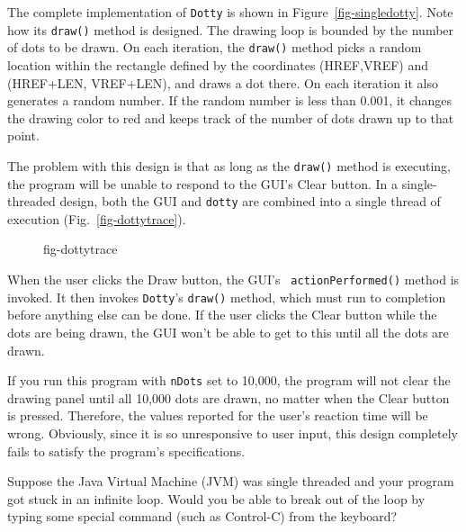 The complete implementation of {\tt Dotty} is shown in
Figure~\ref{fig-singledotty}. Note how its {\tt draw()} method is
designed.  The drawing loop is bounded by the number of dots to be
drawn.  On each iteration, the {\tt draw()} method picks a
random location within the rectangle defined by the coordinates
(HREF,VREF) and (HREF+LEN, VREF+LEN), and draws a dot there.   On each
iteration it also generates a random number.  If the random number is
less than 0.001, it changes the drawing color to red and keeps track
of the number of dots drawn up to that point.

The problem with this design is that as long as the {\tt draw()}
method is executing, the program will be unable to respond to
the GUI's Clear button.  In a single-threaded design, both the
GUI and {\tt dotty} are combined into a single thread of execution
(Fig.~\ref{fig-dottytrace}).
\begin{figure}[h!]
 {fig-dottytrace}

\end{figure}
When the user clicks the Draw button, the GUI's {\tt
actionPerformed()} method is invoked.  It then invokes {\tt Dotty}'s
{\tt draw()} method, which must run to completion before anything else
can be done.  If the user clicks the Clear button while the dots are
being drawn, the GUI won't be able to get to this until all the dots
are drawn.

If you run this program with {\tt nDots} set to 10,000, the program
will not clear the drawing panel until all 10,000 dots are drawn, no
matter when the Clear button is pressed.  Therefore, the values
reported for the user's reaction time will be wrong.   Obviously, since
it is so unresponsive to user input, this design completely fails to
satisfy the program's specifications.


\begin{SSTUDY}

\item  Suppose the Java Virtual Machine (JVM) was single threaded and your
program got stuck in an infinite loop.  Would you be able to break out
of the loop by typing some special command (such as Control-C) from
the keyboard?
\end{SSTUDY}

